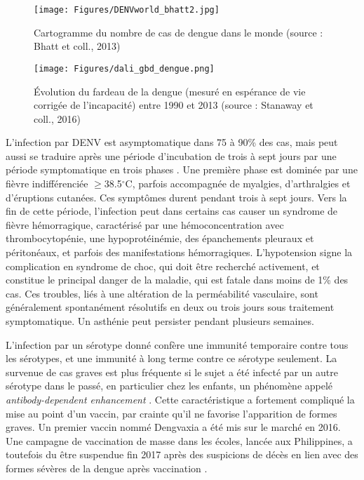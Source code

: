 \begin{figure}[t]
	\centering
	\texttt{[image: Figures/DENVworld\_bhatt2.jpg]}
	\caption{Cartogramme du nombre de cas de dengue dans le monde (source : Bhatt et coll., 2013)}
	\label{fig:denvworld}
\end{figure}


\begin{figure}[t]
	\centering
	\texttt{[image: Figures/dali\_gbd\_dengue.png]}
	\caption{\'Evolution du fardeau de la dengue (mesuré en espérance de vie corrigée de l'incapacité) entre 1990 et 2013 (source : Stanaway et coll., 2016)}
	\label{fig:denvaug}
\end{figure}

L'infection par DENV est asymptomatique dans 75 à 90\% des cas, mais peut aussi se traduire après une période d'incubation de trois à sept jours par une période symptomatique en trois phases \cite{simmons2012dengue}.
Une première phase est dominée par une fièvre indifférenciée $\geq$38.5$^{\circ}$C, parfois accompagnée de myalgies, d'arthralgies et d'éruptions cutanées.
Ces symptômes durent pendant trois à sept jours.
Vers la fin de cette période, l'infection peut dans certains cas causer un syndrome de fièvre hémorragique, caractérisé par une hémoconcentration avec thrombocytopénie, une hypoprotéinémie, des épanchements pleuraux et péritonéaux, et parfois des manifestations hémorragiques.
L'hypotension signe la complication en syndrome de choc, qui doit être recherché activement, et constitue le principal danger de la maladie, qui est fatale dans moins de 1\% des cas.
Ces troubles, liés à une altération de la perméabilité vasculaire, sont généralement spontanément résolutifs en deux ou trois jours sous traitement symptomatique.
Un asthénie peut persister pendant plusieurs semaines.

L'infection par un sérotype donné confère une immunité temporaire contre tous les sérotypes, et une immunité à long terme contre ce sérotype seulement.
La survenue de cas graves est plus fréquente si le sujet a été infecté par un autre sérotype dans le passé, en particulier chez les enfants, un phénomène appelé \textit{antibody-dependent enhancement} \cite{halstead1970observations}.
Cette caractéristique a fortement compliqué la mise au point d'un vaccin, par crainte qu'il ne favorise l'apparition de formes graves.
Un premier vaccin nommé Dengvaxia a été mis sur le marché en 2016.
Une campagne de vaccination de masse dans les écoles, lancée aux Philippines, a toutefois du être suspendue fin 2017 après des suspicions de décès en lien avec des formes sévères de la dengue après vaccination \cite{denguevacc}.



